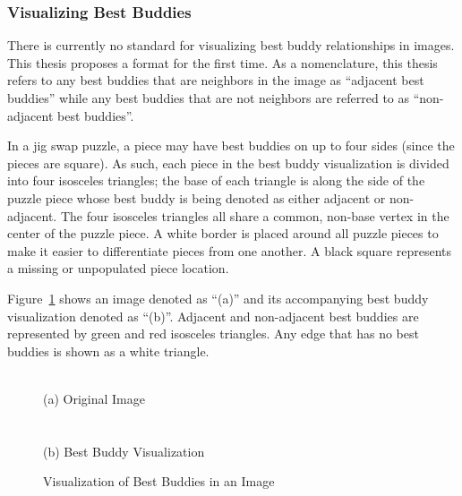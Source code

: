 \documentclass{report}
\begin{document}
\subsubsection{Visualizing Best Buddies}\label{sec:bestBuddiesLimitations}

There is currently no standard for visualizing best buddy relationships in images.  This thesis proposes a format for the first time.  As a nomenclature, this thesis refers to any best buddies that are neighbors in the image as ``adjacent best buddies'' while any best buddies that are not neighbors are referred to as ``non-adjacent best buddies''.  

In a jig swap puzzle, a piece may have best buddies on up to four sides (since the pieces are square).  As such, each piece in the best buddy visualization is divided into four isosceles triangles; the base of each triangle is along the side of the puzzle piece whose best buddy is being denoted as either adjacent or non-adjacent.  The four isosceles triangles all share a common, non-base vertex in the center of the puzzle piece.  A white border is placed around all puzzle pieces to make it easier to differentiate pieces from one another.  A black square represents a missing or unpopulated piece location.

Figure~\ref{fig:bestBuddyVisualization} shows an image denoted as ``(a)'' and its accompanying best buddy visualization denoted as ``(b)''. Adjacent and non-adjacent best buddies are represented by green and red isosceles triangles.  Any edge that has no best buddies is shown as a white triangle.  

\begin{figure}
\centering
{}
\\
(a) Original Image
\\ ~\\
\\
(b) Best Buddy Visualization
\caption{Visualization of Best Buddies in an Image}
\label{fig:bestBuddyVisualization}
\end{figure}
\end{document}

